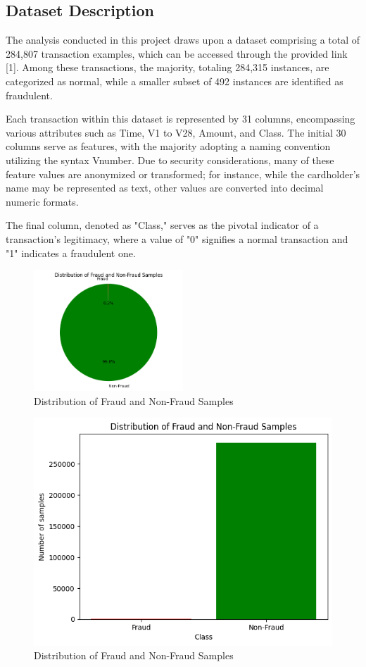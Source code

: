 \documentclass[conference]{IEEEtran}
\begin{document}
\subsection{Dataset Description}\label{AA}
The analysis conducted in this project draws upon a dataset comprising a total of 284,807 transaction examples, which can be accessed through the provided link [1]. Among these transactions, the majority, totaling 284,315 instances, are categorized as normal, while a smaller subset of 492 instances are identified as fraudulent.

Each transaction within this dataset is represented by 31 columns, encompassing various attributes such as Time, V1 to V28, Amount, and Class. The initial 30 columns serve as features, with the majority adopting a naming convention utilizing the syntax Vnumber. Due to security considerations, many of these feature values are anonymized or transformed; for instance, while the cardholder's name may be represented as text, other values are converted into decimal numeric formats.

The final column, denoted as "Class," serves as the pivotal indicator of a transaction's legitimacy, where a value of "0" signifies a normal transaction and "1" indicates a fraudulent one.

\begin{figure}[htbp]
\centering
\includegraphics[width=0.5\textwidth]{images/fraudvsnonfraud1.png}
\caption{Distribution of Fraud and Non-Fraud Samples}
\label{fig}
\end{figure}
\begin{figure}
    \centering
    \includegraphics[width=1\linewidth]{images/fraudvsnonfraud2.png}
    \caption{Distribution of Fraud and Non-Fraud Samples}
    \label{fig:enter-label}
\end{figure}
\end{document}
